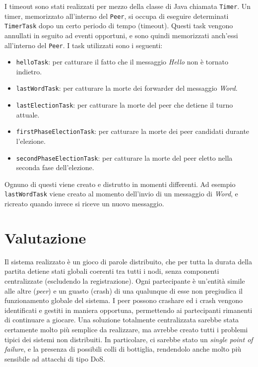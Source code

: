 \documentclass[9pt]{article}
\begin{document}
I timeout sono stati realizzati per mezzo della classe di Java chiamata \texttt{Timer}. Un timer, memorizzato all'interno del \texttt{Peer}, si occupa di eseguire determinati \texttt{TimerTask} dopo un certo periodo di tempo (timeout). Questi task vengono annullati in seguito ad eventi opportuni, e sono quindi memorizzati anch'essi all'interno del \texttt{Peer}.
I task utilizzati sono i seguenti:
\begin{itemize}
\item \texttt{helloTask}: per catturare il fatto che il messaggio \textit{Hello} non è tornato indietro.
\item \texttt{lastWordTask}: per catturare la morte dei forwarder del messaggio \textit{Word}.
\item \texttt{lastElectionTask}: per catturare la morte del peer che detiene il turno attuale.
\item \texttt{firstPhaseElectionTask}: per catturare la morte dei peer candidati durante l'elezione.
\item \texttt{secondPhaseElectionTask}: per catturare la morte del peer eletto nella seconda fase dell'elezione.
\end{itemize}

Ognuno di questi viene creato e distrutto in momenti differenti. Ad esempio \texttt{lastWordTask} viene creato al momento dell'invio di un messaggio di \textit{Word}, e ricreato quando invece si riceve un nuovo messaggio.

\section{Valutazione}

Il sistema realizzato è un gioco di parole distribuito, che per tutta la durata della partita detiene stati globali coerenti tra tutti i nodi, senza componenti centralizzate (escludendo la registrazione). Ogni partecipante è un'entità simile alle altre (\emph{peer}) e un guasto (crash) di una qualunque di esse non pregiudica il funzionamento globale del sistema. I peer possono crashare ed i crash vengono identificati e gestiti in maniera opportuna, permettendo ai partecipanti rimanenti di continuare a giocare. Una soluzione totalmente centralizzata sarebbe stata certamente molto più semplice da realizzare, ma avrebbe creato tutti i problemi tipici dei sistemi non distribuiti. In particolare, ci sarebbe stato un \emph{single point of failure}, e la presenza di possibili colli di bottiglia, rendendolo anche molto più sensibile ad attacchi di tipo DoS.
\end{document}
